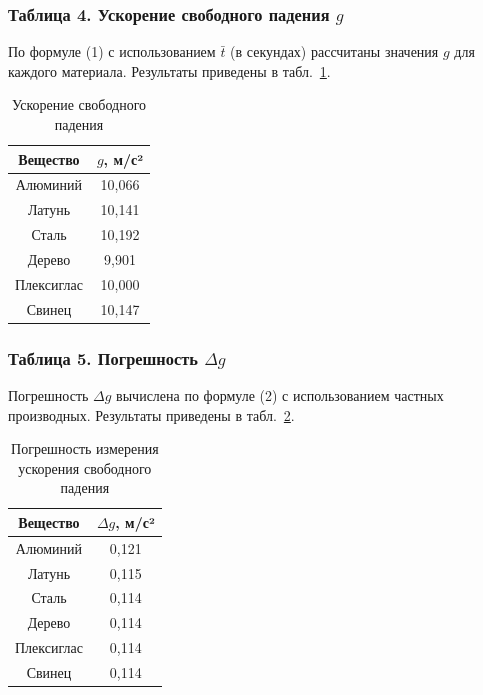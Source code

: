 \subsubsection{Таблица 4. Ускорение свободного падения $g$}
По формуле (1) с использованием $\bar{t}$ (в секундах) рассчитаны значения $g$ для каждого материала. Результаты приведены в табл.~\ref{tab:g}.

\begin{table}[ht!]
\centering
\caption{Ускорение свободного падения}
\label{tab:g}
\begin{tabular}{|c|c|}
\hline
Вещество & $g$, м/с² \\
\hline
Алюминий   & 10,066 \\
Латунь     & 10,141 \\
Сталь      & 10,192 \\
Дерево     & 9,901  \\
Плексиглас & 10,000 \\
Свинец     & 10,147 \\
\hline
\end{tabular}
\end{table}

\subsubsection{Таблица 5. Погрешность $\Delta g$}
Погрешность $\Delta g$ вычислена по формуле (2) с использованием частных производных. Результаты приведены в табл.~\ref{tab:dg}.

\begin{table}[ht!]
\centering
\caption{Погрешность измерения ускорения свободного падения}
\label{tab:dg}
\begin{tabular}{|c|c|}
\hline
Вещество & $\Delta g$, м/с² \\
\hline
Алюминий   & 0,121 \\
Латунь     & 0,115 \\
Сталь      & 0,114 \\
Дерево     & 0,114 \\
Плексиглас & 0,114 \\
Свинец     & 0,114 \\
\hline
\end{tabular}
\end{table}

